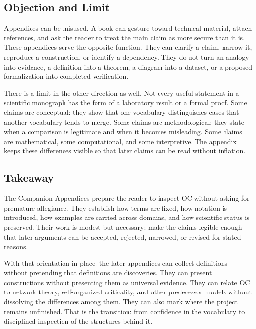 \documentclass[11pt,a4paper,openany]{book}
\begin{document}
\subsection{Objection and Limit}
Appendices can be misused. A book can gesture toward technical material, attach references, and ask the reader to treat the main claim as more secure than it is. These appendices serve the opposite function. They can clarify a claim, narrow it, reproduce a construction, or identify a dependency. They do not turn an analogy into evidence, a definition into a theorem, a diagram into a dataset, or a proposed formalization into completed verification. \cite{raf_networks,bak_soc}\par
There is a limit in the other direction as well. Not every useful statement in a scientific monograph has the form of a laboratory result or a formal proof. Some claims are conceptual: they show that one vocabulary distinguishes cases that another vocabulary tends to merge. Some claims are methodological: they state when a comparison is legitimate and when it becomes misleading. Some claims are mathematical, some computational, and some interpretive. The appendix keeps these differences visible so that later claims can be read without inflation.\par
\subsection{Takeaway}
The Companion Appendices prepare the reader to inspect OC without asking for premature allegiance. They establish how terms are fixed, how notation is introduced, how examples are carried across domains, and how scientific status is preserved. Their work is modest but necessary: make the claims legible enough that later arguments can be accepted, rejected, narrowed, or revised for stated reasons. \cite{raf_networks,bak_soc}\par
With that orientation in place, the later appendices can collect definitions without pretending that definitions are discoveries. They can present constructions without presenting them as universal evidence. They can relate OC to network theory, self-organized criticality, and other predecessor models without dissolving the differences among them. They can also mark where the project remains unfinished. That is the transition: from confidence in the vocabulary to disciplined inspection of the structures behind it.\par
\clearpage
\nocite{*}
\printbibliography[heading=bibintoc,title={Bibliography}]
\end{document}
